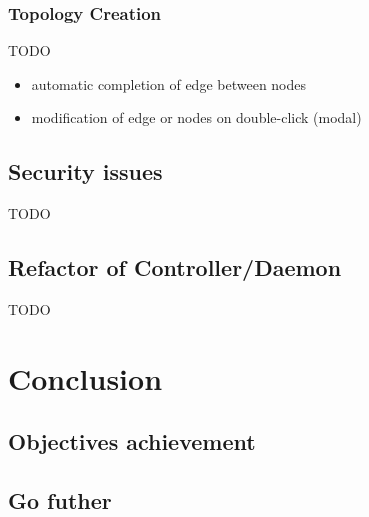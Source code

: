 \documentclass{eplmastersthesis}
\begin{document}
      \subsection{Topology Creation}
      {\color{red} TODO}
      \begin{itemize}
        \item automatic completion of edge between nodes
        \item modification of edge or nodes on double-click (modal)
      \end{itemize}

    \section{Security issues}
    {\color{red} TODO}

    \section{Refactor of Controller/Daemon}
    {\color{red} TODO}

  \chapter{Conclusion}

    \section{Objectives achievement}

    \section{Go futher}

  \nocite{*}
  
  

  \backcoverpage
\end{document}

